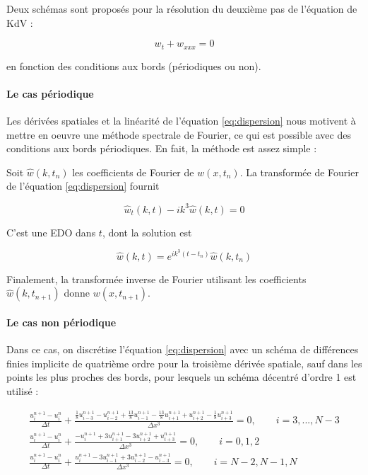 \indent Deux schémas sont proposés pour la résolution du deuxième pas de l'équation de KdV :

\begin{equation}
	\label{eq:dispersion}
	w_t + w_{xxx} = 0
\end{equation}

\noindent en fonction des conditions aux bords (périodiques ou non).

\paragraph{Le cas périodique}

\indent Les dérivées spatiales et la linéarité de l'équation \eqref{eq:dispersion} nous motivent à mettre en oeuvre une méthode spectrale de Fourier, ce qui est possible avec des conditions aux bords périodiques. En fait, la méthode est assez simple :

\indent Soit $\hat{w}(k,t_n)$  les coefficients de Fourier de $w(x,t_n)$. La transformée de Fourier de l'équation \eqref{eq:dispersion} fournit

\begin{equation*}
	\hat{w}_t(k,t) - ik^3\hat{w}(k,t) = 0
\end{equation*}

\indent C'est une EDO dans $t$, dont la solution est

\begin{equation*}
\hat{w}(k,t) = e^{ik^3(t-t_n)}\hat{w}(k,t_n)
\end{equation*}

\indent Finalement, la transformée inverse de Fourier utilisant les coefficients $\hat{w}(k,t_{n+1})$ donne $w(x,t_{n+1})$.

\paragraph{Le cas non périodique}

\indent Dans ce cas, on discrétise l'équation \eqref{eq:dispersion} avec un schéma de différences finies implicite de quatrième ordre pour la troisième dérivée spatiale, sauf dans les points les plus proches des bords, pour lesquels un schéma décentré  d'ordre 1 est utilisé :

\begin{equation*}
\begin{gathered}
	\frac{u_i^{n+1} - u_i^n}{\Delta t} + \frac{\frac{1}{8}u_{i-3}^{n+1} - u_{i-2}^{n+1}  + \frac{13}{8}u_{i-1}^{n+1} - \frac{13}{8}u_{i+1}^{n+1} + u_{i+2}^{n+1} - \frac{1}{8}u_{i+3}^{n+1}}{\Delta x^3} = 0, \qquad i = 3,...,N-3 \\
	\frac{u_i^{n+1} - u_i^n}{\Delta t}  + \frac{-u_{i}^{n+1} + 3u_{i+1}^{n+1}  -3 u_{i+2}^{n+1} + u_{i+3}^{n+1} }{\Delta x^3} = 0, \qquad i = 0,1,2 \\
	\frac{u_i^{n+1} - u_i^n}{\Delta t}  + \frac{u_{i}^{n+1} - 3u_{i-1}^{n+1}  + 3 u_{i-2}^{n+1} - u_{i-3}^{n+1} }{\Delta x^3} = 0, \qquad i = N-2,N-1,N 
\end{gathered} 
\end{equation*}

